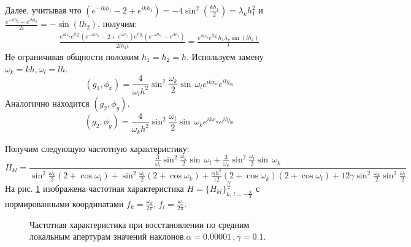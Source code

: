 \documentclass{article}
\begin{document}
Далее, учитывая что $(e^{-ikh_1} - 2 + e^{ikh_1}) = -4\sin^2(\frac{kh_1}{2}) = \lambda_k h_1^2$ и $\frac{e^{-ilh_2} - e^{ikh_2}}{2i} = -\sin (lh_2)$, получим:
\begin{align*}
\frac{e^{ikx_s}e^{ily_t}(e^{-ikh_1}-2+e^{ikh_1})e^{ily_t}(e^{-ilh_2}-e^{ilh_2})}{2lh_1i} = \frac{e^{ikx_s}e^{ily_t}h_1\lambda_k\sin(lh_2)}{l}
\end{align*}
Не ограничивая общности положим $h_1 = h_2 = h$. Используем замену $\omega_k = kh, \omega_l = lh$.
$$(g_1, \phi_x) = \frac{4}{\omega_l h^2}  \sin^2\frac{\omega_k}{2}  \sin\,\omega_l e^{ikx_n}e^{ily_m}$$
Аналогично находится $(g_2, \phi_y)$.
$$(g_2, \phi_y) = \frac{4}{\omega_k h^2}  \sin^2\frac{\omega_l}{2}  \sin\,\omega_k e^{ikx_n} e^{ily_m}$$

Получим следующую частотную характеристику:
$$H_{kl} = \frac{\frac{3}{\omega_l}  \sin^2\frac{\omega_k}{2}  \sin\,\omega_l + \frac{3}{\omega_k}  \sin^2\frac{\omega_l}{2}  \sin\,\omega_k }
            { \sin^2\frac{\omega_k}{2}(2 +  \cos\omega_l) +  \sin^2\frac{\omega_l}{2}(2  +  \cos\omega_k) + \frac{\alpha h^2}{12}(2 +  \cos\omega_k)(2 +  \cos\omega_l) + 12\gamma  \sin^2\frac{\omega_k}{2}  \sin^2\frac{\omega_l}{2}}$$
На рис. \ref{ris:piece_plt} изображена частотная характеристика $H=\{H_{kl}\}^{\frac{N}{2}}_{k,\,l=-\frac{N}{2}}$ с нормированными координатами $f_k = \frac{\omega_k}{2\pi} ,\, f_l = \frac{\omega_l}{2\pi}$.
\begin{figure}[H]
\caption{Частотная характеристика при восстановлении по средним локальным апертурам значений наклонов.$ \alpha = 0.00001\,,\gamma = 0.1$.}
\label{ris:piece_plt}
\end{figure}
\end{document}

